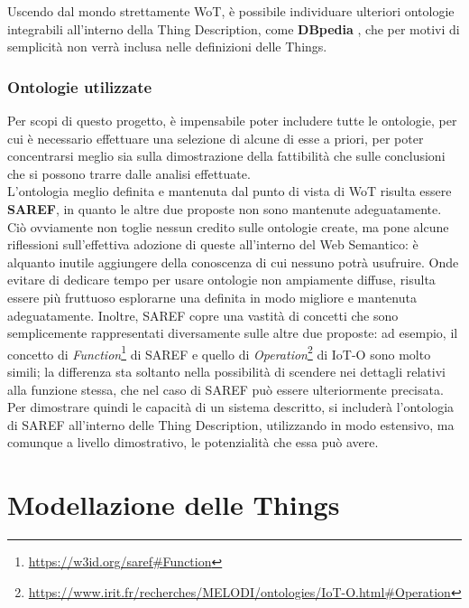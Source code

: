 \documentclass[12pt,a4paper,openright,oneside]{report}
\begin{document}
Uscendo dal mondo strettamente WoT, è possibile individuare ulteriori ontologie integrabili all'interno della Thing Description, come \textbf{DBpedia} \cite{dbpedia}, che per motivi di semplicità non verrà inclusa nelle definizioni delle Things.


\subsection{Ontologie utilizzate}
Per scopi di questo progetto, è impensabile poter includere tutte le ontologie, per cui è necessario effettuare una selezione di alcune di esse a priori, per poter concentrarsi meglio sia sulla dimostrazione della fattibilità che sulle conclusioni che si possono trarre dalle analisi effettuate.\\

L'ontologia meglio definita e mantenuta dal punto di vista di WoT risulta essere \textbf{SAREF}, in quanto le altre due proposte non sono mantenute adeguatamente. Ciò ovviamente non toglie nessun credito sulle ontologie create, ma pone alcune riflessioni sull'effettiva adozione di queste all'interno del Web Semantico: è alquanto inutile aggiungere della conoscenza di cui nessuno potrà usufruire. Onde evitare di dedicare tempo per usare ontologie non ampiamente diffuse, risulta essere più fruttuoso esplorarne una definita in modo migliore e mantenuta adeguatamente. Inoltre, SAREF copre una vastità di concetti che sono semplicemente rappresentati diversamente sulle altre due proposte: ad esempio, il concetto di \textit{Function}\footnote{\url{https://w3id.org/saref\#Function}} di SAREF e quello di \textit{Operation}\footnote{\url{https://www.irit.fr/recherches/MELODI/ontologies/IoT-O.html\#Operation}} di IoT-O sono molto simili; la differenza sta soltanto nella possibilità di scendere nei dettagli relativi alla funzione stessa, che nel caso di SAREF può essere ulteriormente precisata.\\

Per dimostrare quindi le capacità di un sistema descritto, si includerà l'ontologia di SAREF all'interno delle Thing Description, utilizzando in modo estensivo, ma comunque a livello dimostrativo, le potenzialità che essa può avere.\\



\clearpage{\pagestyle{empty}\cleardoublepage}
\chapter{Modellazione delle Things}           %
\lhead[\fancyplain{}{\bfseries\thepage}]{\fancyplain{}{\bfseries\rightmark}}  
\end{document}
